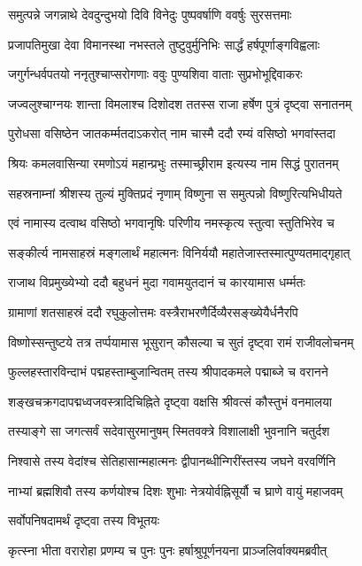 \twolineshloka
{समुत्पन्ने जगन्नाथे देवदुन्दुभयो दिवि}
{विनेदुः पुष्पवर्षाणि ववर्षुः सुरसत्तमाः}%

\twolineshloka
{प्रजापतिमुखा देवा विमानस्था नभस्तले}
{तुष्टुवुर्मुनिभिः सार्द्धं हर्षपूर्णाङ्गविह्वलाः}%

\twolineshloka
{जगुर्गन्धर्वपतयो ननृतुश्चाप्सरोगणाः}
{ववुः पुण्यशिवा वाताः सुप्रभोभूद्दिवाकरः}%

\twolineshloka
{जज्वलुश्चाग्नयः शान्ता विमलाश्च दिशोदश}
{ततस्स राजा हर्षेण पुत्रं दृष्ट्वा सनातनम्}%

\twolineshloka
{पुरोधसा वसिष्ठेन जातकर्म्मतदाऽकरोत्}
{नाम चास्मै ददौ रम्यं वसिष्ठो भगवांस्तदा}%

\twolineshloka
{श्रियः कमलवासिन्या रमणोऽयं महान्प्रभुः}
{तस्माच्छ्रीराम इत्यस्य नाम सिद्धं पुरातनम्}%

\twolineshloka
{सहस्रनाम्नां श्रीशस्य तुल्यं मुक्तिप्रदं नृणाम्}
{विष्णुना स समुत्पन्नो विष्णुरित्यभिधीयते}%

\twolineshloka
{एवं नामास्य दत्वाथ वसिष्ठो भगवानृषिः}
{परिणीय नमस्कृत्य स्तुत्वा स्तुतिभिरेव च}%

\twolineshloka
{सङ्कीर्त्य नामसाहस्रं मङ्गलार्थं महात्मनः}
{विनिर्ययौ महातेजास्तस्मात्पुण्यतमाद्गृहात्}%

\twolineshloka
{राजाथ विप्रमुख्येभ्यो ददौ बहुधनं मुदा}
{गवामयुतदानं च कारयामास धर्म्मतः}%

\twolineshloka
{ग्रामाणां शतसाहस्रं ददौ रघुकुलोत्तमः}
{वस्त्रैराभरणैर्दिव्यैरसङ्ख्येयैर्धनैरपि}%

\twolineshloka
{विष्णोस्सन्तुष्टये तत्र तर्प्पयामास भूसुरान्}
{कौसल्या च सुतं दृष्ट्वा रामं राजीवलोचनम्}%

\twolineshloka
{फुल्लहस्तारविन्दाभं पद्महस्ताम्बुजान्वितम्}
{तस्य श्रीपादकमले पद्माब्जे च वरानने}%

\twolineshloka
{शङ्खचक्रगदापद्मध्वजवस्त्रादिचिह्निते}
{दृष्ट्वा वक्षसि श्रीवत्सं कौस्तुभं वनमालया}%

\twolineshloka
{तस्याङ्गे सा जगत्सर्वं सदेवासुरमानुषम्}
{स्मितवक्त्रे विशालाक्षी भुवनानि चतुर्दश}%

\twolineshloka
{निश्वासे तस्य वेदांश्च सेतिहासान्महात्मनः}
{द्वीपानब्धीन्गिरींस्तस्य जघने वरवर्णिनि}%

\twolineshloka
{नाभ्यां ब्रह्मशिवौ तस्य कर्णयोश्च दिशः शुभाः}
{नेत्रयोर्वह्निसूर्यौ च घ्राणे वायुं महाजवम्}%

सर्वोपनिषदामर्थं दृष्ट्वा तस्य विभूतयः

\twolineshloka
{कृत्स्ना भीता वरारोहा प्रणम्य च पुनः पुनः}
{हर्षाश्रुपूर्णनयना प्राञ्जलिर्वाक्यमब्रवीत्}%

